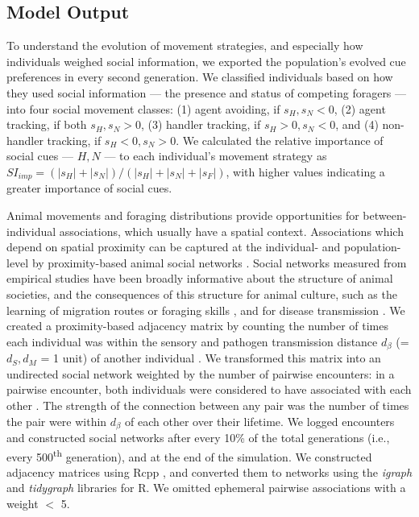 \subsection*{Model Output}

To understand the evolution of movement strategies, and especially how individuals weighed social information, we exported the population's evolved cue preferences in every second generation.
We classified individuals based on how they used social information --- the presence and status of competing foragers --- into four social movement classes: (1) agent avoiding, if $s_H, s_N < 0$, (2) agent tracking, if both $s_H, s_N > 0$, (3) handler tracking, if $s_H > 0, s_N < 0$, and (4) non-handler tracking, if $s_H < 0, s_N > 0$.
We calculated the relative importance of social cues --- $H, N$ --- to each individual's movement strategy as $ SI_{imp} = (|s_H| + |s_N|) / (|s_H| + |s_N| + |s_F|)$, with higher values indicating a greater importance of social cues.

Animal movements and foraging distributions provide opportunities for between-individual associations, which usually have a spatial context.
Associations which depend on spatial proximity can be captured at the individual- and population-level by proximity-based animal social networks \citep{whitehead2008,farine2015}.
Social networks measured from empirical studies have been broadly informative about the structure of animal societies, and the consequences of this structure for animal culture, such as the learning of migration routes or foraging skills \citep{aplin2012,aplin2013,cantor2021}, and for disease transmission \citep{stroeymeyt2018,albery2021,cantor2021}.
We created a proximity-based adjacency matrix by counting the number of times each individual was within the sensory and pathogen transmission distance $d_\beta$ (= $d_S, d_M$ = 1 unit) of another individual \citep{whitehead2008,wilber2022}.
We transformed this matrix into an undirected social network weighted by the number of pairwise encounters: in a pairwise encounter, both individuals were considered to have associated with each other \citep{white2017}.
The strength of the connection between any pair was the number of times the pair were within $d_\beta$ of each other over their lifetime.
We logged encounters and constructed social networks after every 10\% of the total generations (i.e., every 500\textsuperscript{th} generation), and at the end of the simulation.
We constructed adjacency matrices using Rcpp \citep[][]{eddelbuettel2013}, and converted them to networks using the \textit{igraph} \citep{csardi2006} and \textit{tidygraph} \citep{pedersen2020} libraries for R.
We omitted ephemeral pairwise associations with a weight $<$ 5.

